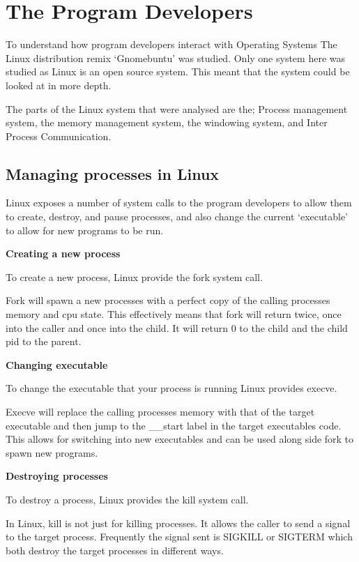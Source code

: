 \documentclass[a4paper]{report}
\begin{document}
\section{The Program Developers}

To understand how program developers interact with Operating Systems The Linux distribution remix `Gnomebuntu' was studied. Only one system here was studied as Linux is an open source system. This meant that the system could be looked at in more depth.

The parts of the Linux system that were analysed are the; Process management system, the memory management system, the windowing system, and Inter Process Communication.

\subsection{Managing processes in Linux}

Linux exposes a number of system calls to the program developers to allow them to create, destroy, and pause processes, and also change the current `executable' to allow for new programs to be run.

\noindent
\textbf{Creating a new process}

To create a new process, Linux provide the fork system call. \cite{manFork}

Fork will spawn a new processes with a perfect copy of the calling processes memory and cpu state. This effectively means that fork will return twice, once into the caller and once into the child. It will return 0 to the child and the child pid to the parent.

\noindent
\textbf{Changing executable}

To change the executable that your process is running Linux provides execve. \cite{manExecve}

Execve will replace the calling processes memory with that of the target executable and then jump to the \_\_start label in the target executables code. This allows for switching into new executables and can be used along side fork to spawn new programs.

\noindent
\textbf{Destroying processes}

To destroy a process, Linux provides the kill system call. \cite{manKill}

In Linux, kill is not just for killing processes. It allows the caller to send a signal to the target process. Frequently the signal sent is SIGKILL or SIGTERM which both destroy the target processes in different ways.
\end{document}

